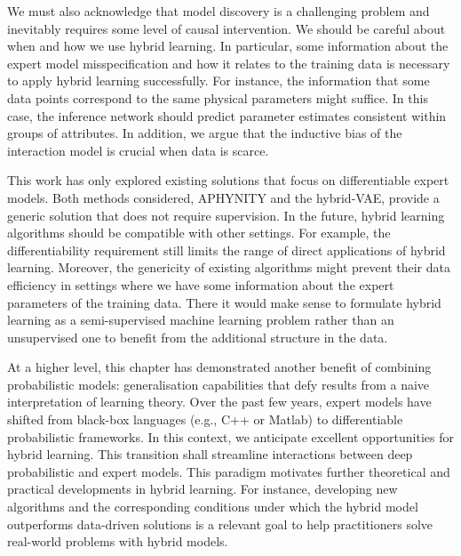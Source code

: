 We must also acknowledge that model discovery is a challenging problem and inevitably requires some level of causal intervention. We should be careful about when and how we use hybrid learning. In particular, some information about the expert model misspecification and how it relates to the training data is necessary to apply hybrid learning successfully. For instance, the information that some data points correspond to the same physical parameters might suffice. In this case, the inference network should predict parameter estimates consistent within groups of attributes. In addition, we argue that the inductive bias of the interaction model is crucial when data is scarce.

This work has only explored existing solutions that focus on differentiable expert models. Both methods considered, APHYNITY and the hybrid-VAE, provide a generic solution that does not require supervision. In the future, hybrid learning algorithms should be compatible with other settings. For example, the differentiability requirement still limits the range of direct applications of hybrid learning. Moreover, the genericity of existing algorithms might prevent their data efficiency in settings where we have some information about the expert parameters of the training data. There it would make sense to formulate hybrid learning as a semi-supervised machine learning problem rather than an unsupervised one to benefit from the additional structure in the data.

At a higher level, this chapter has demonstrated another benefit of combining probabilistic models: generalisation capabilities that defy results from a naive interpretation of learning theory. Over the past few years, expert models have shifted from black-box languages (e.g., C++ or Matlab) to differentiable probabilistic frameworks. In this context, we anticipate excellent opportunities for hybrid learning. This transition shall streamline interactions between deep probabilistic and expert models. This paradigm motivates further theoretical and practical developments in hybrid learning. For instance, developing new algorithms and the corresponding conditions under which the hybrid model outperforms data-driven solutions is a relevant goal to help practitioners solve real-world problems with hybrid models.
